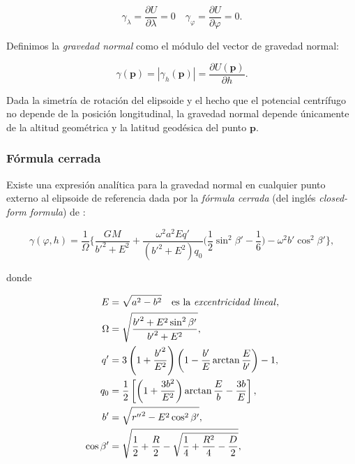 \begin{equation}
    \gamma_\lambda =
        \frac{\partial U}{\partial \lambda} = 0  \quad
    \gamma_\varphi =
        \frac{\partial U}{\partial \varphi} = 0.
\end{equation}

Definimos la \emph{gravedad normal} como el módulo del vector de gravedad
normal:

\begin{equation}
    \gamma(\mathbf{p}) = | \gamma_h(\mathbf{p}) | =
        \frac{\partial U(\mathbf{p})}{\partial h}.
\end{equation}

Dada la simetría de rotación del elipsoide y el hecho que el potencial
centrífugo no depende de la posición longitudinal, la gravedad normal depende
únicamente de la altitud geométrica y la latitud geodésica del punto
$\mathbf{p}$.

\subsubsection{Fórmula cerrada}

Existe una expresión analítica para la gravedad normal en cualquier punto
externo al elipsoide de referencia dada por la \emph{fórmula cerrada} (del
inglés \emph{closed-form formula}) de \citet{li2001}:


\begin{equation}
    \gamma(\varphi, h) =
    \frac{1}{\Omega}
    \Bigg\{
        \frac{G M}{{b'}^2 + E^2}
        + \frac{\omega^2 a^2 E q'}{({b'}^2 + E^2) q_0}
        \Bigg(
            \frac{1}{2}
            \sin^2 \beta' - \frac{1}{6}
        \Bigg)
        - \omega^2 b' \cos^2 \beta'
    \Bigg\},
    \label{eq:normal-gravity-closed-form}
\end{equation}

\noindent donde

\begin{align}
    E &= \sqrt{a^2 - b^2}
        \quad \text{es la \emph{excentricidad lineal}}, \\
    \Omega &= \sqrt{\frac{{b'}^2 + E^2 \sin^2 \beta'}{{b'}^2 + E^2}}, \\
    q' &= 3
        \left(1 + \frac{{b'}^2}{E^2} \right)
        \left(1 - \frac{b'}{E} \arctan \frac{E}{b'} \right)
        - 1, \\
    q_0 &= \frac{1}{2}
        \left[
            \left(
                1 + \frac{3b^2}{E^2}
            \right)
            \arctan \frac{E}{b} - \frac{3b}{E}
        \right], \\
    b' &= \sqrt{{r''}^2 - E^2 \cos^2 \beta'}, \\
    \cos \beta' &= \sqrt{
        \frac{1}{2}
        + \frac{R}{2}
        - \sqrt{
            \frac{1}{4} + \frac{R^2}{4}  - \frac{D}{2}
        }
    },
\end{align}

